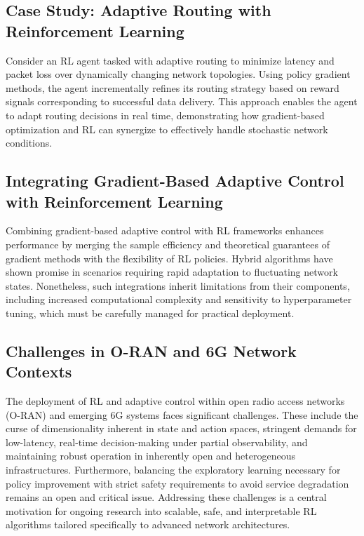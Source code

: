 \documentclass[sigconf]{acmart}
\begin{document}
\subsection{Case Study: Adaptive Routing with Reinforcement Learning}

Consider an RL agent tasked with adaptive routing to minimize latency and packet loss over dynamically changing network topologies. Using policy gradient methods, the agent incrementally refines its routing strategy based on reward signals corresponding to successful data delivery. This approach enables the agent to adapt routing decisions in real time, demonstrating how gradient-based optimization and RL can synergize to effectively handle stochastic network conditions.

\subsection{Integrating Gradient-Based Adaptive Control with Reinforcement Learning}

Combining gradient-based adaptive control with RL frameworks enhances performance by merging the sample efficiency and theoretical guarantees of gradient methods with the flexibility of RL policies. Hybrid algorithms have shown promise in scenarios requiring rapid adaptation to fluctuating network states. Nonetheless, such integrations inherit limitations from their components, including increased computational complexity and sensitivity to hyperparameter tuning, which must be carefully managed for practical deployment.

\subsection{Challenges in O-RAN and 6G Network Contexts}

The deployment of RL and adaptive control within open radio access networks (O-RAN) and emerging 6G systems faces significant challenges. These include the curse of dimensionality inherent in state and action spaces, stringent demands for low-latency, real-time decision-making under partial observability, and maintaining robust operation in inherently open and heterogeneous infrastructures. Furthermore, balancing the exploratory learning necessary for policy improvement with strict safety requirements to avoid service degradation remains an open and critical issue. Addressing these challenges is a central motivation for ongoing research into scalable, safe, and interpretable RL algorithms tailored specifically to advanced network architectures.
\end{document}
